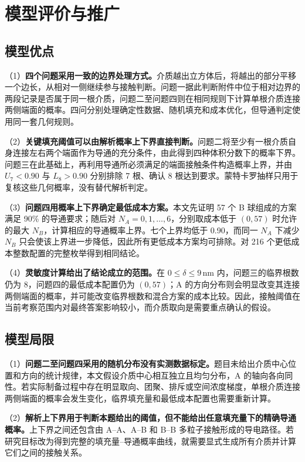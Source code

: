 \documentclass[withoutpreface,bwprint]{cumcmthesis}
\begin{document}

\section{模型评价与推广}

\subsection{模型优点}

（1）\textbf{四个问题采用一致的边界处理方式。}介质越出立方体后，将越出的部分平移一个边长，从相对一侧继续参与接触判断。问题一据此判断附件中位于相对边界的两段记录是否属于同一根介质，问题二至问题四则在相同规则下计算单根介质连接两侧端面的概率。四问分别处理确定性数据、随机填充和成本优化，但导通判定使用同一套几何规则。

（2）\textbf{关键填充阈值可以由解析概率上下界直接判断。}问题二将至少有一根介质自身连接左右两个端面作为导通的充分条件，由此得到四种体积分数下的概率下界。问题三在此基础上，再利用导通所必须满足的端面接触条件构造概率上界，并由 $U_7<0.90$ 与 $L_8>0.90$ 分别排除 7 根、确认 8 根达到要求。蒙特卡罗抽样只用于复核这些几何概率，没有替代解析判定。

（3）\textbf{问题四用概率上下界确定最低成本方案。}本文先证明 57 个 B 球组成的方案满足 90\% 的导通要求；随后对 $N_A=0,1,\ldots,6$，分别取成本低于 $(0,57)$ 时允许的最大 $N_B$，计算相应的导通概率上界。七个上界均低于 0.90，而同一 $N_A$ 下减少 $N_B$ 只会使该上界进一步降低，因此所有更低成本方案均可排除。对 216 个更低成本整数配置的完整枚举得到相同结论。

（4）\textbf{灵敏度计算给出了结论成立的范围。}在 $0\leq\delta\leq9\,\mathrm{nm}$ 内，问题三的临界根数仍为 8，问题四的最低成本配置仍为 $(0,57)$；A 的方向分布则会明显改变其连接两侧端面的概率，并可能改变临界根数和混合方案的成本比较。因此，接触阈值在当前考察范围内对最终答案影响较小，而介质取向是需要重点确认的假设。

\subsection{模型局限}

（1）\textbf{问题二至问题四采用的随机分布没有实测数据标定。}题目未给出介质中心位置和方向的统计规律，本文假设介质中心相互独立且均匀分布，A 的轴向各向同性。若实际制备过程中存在明显取向、团聚、排斥或空间浓度梯度，单根介质连接两侧端面的概率会发生变化，临界填充量和最低成本配置也需要重新计算。

（2）\textbf{解析上下界用于判断本题给出的阈值，但不能给出任意填充量下的精确导通概率。}上下界之间还包含由 A--A、A--B 和 B--B 多粒子接触形成的导电路径。若研究目标改为得到完整的填充量--导通概率曲线，就需要显式生成所有介质并计算它们之间的接触关系。
\end{document}
